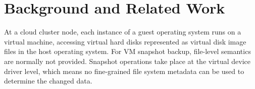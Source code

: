 
\section{Background and Related Work}
\label{sect:background}




At a cloud cluster node, each instance of a guest operating system runs on a virtual machine, accessing virtual hard disks 
represented as virtual disk image files in the host operating system.
For VM snapshot backup, file-level semantics are normally not provided.
Snapshot operations take place at the virtual device driver level, which means no fine-grained file system metadata can be used to determine the changed data. 


